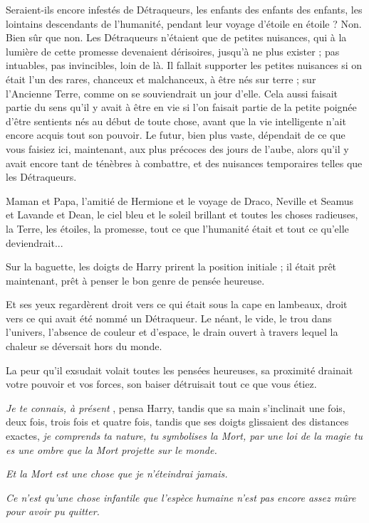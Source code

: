 Seraient-ils encore infestés de Détraqueurs, les enfants des enfants des enfants, les lointains descendants de l'humanité, pendant leur voyage d'étoile en étoile ? Non. Bien sûr que non. Les Détraqueurs n'étaient que de petites nuisances, qui à la lumière de cette promesse devenaient dérisoires, jusqu'à ne plus exister ; pas intuables, pas invincibles, loin de là. Il fallait supporter les petites nuisances si on était l'un des rares, chanceux et malchanceux, à être nés sur terre ; sur l'Ancienne Terre, comme on se souviendrait un jour d'elle. Cela aussi faisait partie du sens qu'il y avait à être en vie si l'on faisait partie de la petite poignée d'être sentients nés au début de toute chose, avant que la vie intelligente n'ait encore acquis tout son pouvoir. Le futur, bien plus vaste, dépendait de ce que vous faisiez ici, maintenant, aux plus précoces des jours de l'aube, alors qu'il y avait encore tant de ténèbres à combattre, et des nuisances temporaires telles que les Détraqueurs.

Maman et Papa, l'amitié de Hermione et le voyage de Draco, Neville et Seamus et Lavande et Dean, le ciel bleu et le soleil brillant et toutes les choses radieuses, la Terre, les étoiles, la promesse, tout ce que l'humanité était et tout ce qu'elle deviendrait...

Sur la baguette, les doigts de Harry prirent la position initiale ; il était prêt maintenant, prêt à penser le bon genre de pensée heureuse.

Et ses yeux regardèrent droit vers ce qui était sous la cape en lambeaux, droit vers ce qui avait été nommé un Détraqueur. Le néant, le vide, le trou dans l'univers, l'absence de couleur et d'espace, le drain ouvert à travers lequel la chaleur se déversait hors du monde.

La peur qu'il exsudait volait toutes les pensées heureuses, sa proximité drainait votre pouvoir et vos forces, son baiser détruisait tout ce que vous étiez.

\emph{Je te connais, à présent} , pensa Harry, tandis que sa main s'inclinait une fois, deux fois, trois fois et quatre fois, tandis que ses doigts glissaient des distances exactes, \emph{je comprends ta nature, tu symbolises la Mort, par une loi de la magie tu es une ombre que la Mort projette sur le monde.} 

\emph{Et la Mort est une chose que je n'éteindrai jamais.} 

\emph{Ce n'est qu'une chose infantile que l'espèce humaine n'est pas encore assez mûre pour avoir pu quitter.} 

